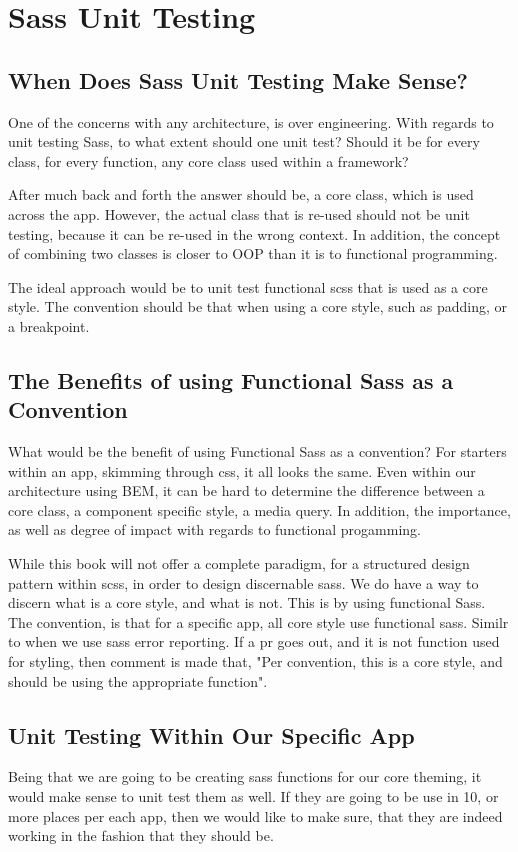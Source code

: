 \maketitle{}
\section{ Sass Unit Testing }

\subsection{ When Does Sass Unit Testing Make Sense? }
One of the concerns with any architecture, is over engineering. With regards to
unit testing Sass, to what extent should one unit test? Should it be for every
class, for every function, any core class used within a framework?

After much back and forth the answer should be, a core class, which is used
across the app. However, the actual class that is re-used should not be unit
testing, because it can be re-used in the wrong context. In addition, the
concept of combining two classes is closer to OOP than it is to functional
programming.

The ideal approach would be to unit test functional scss that is used as a
core style. The convention should be that when using a core style, such as
padding, or a breakpoint.

\subsection{ The Benefits of using Functional Sass as a Convention }
What would be the benefit of using Functional Sass as a convention? For starters
within an app, skimming through css, it all looks the same. Even within our
architecture using BEM, it can be hard to determine the difference between a
core class, a component specific style, a media query. In addition, the
importance, as well as degree of impact with regards to functional progamming.

While this book will not offer a complete paradigm, for a structured design
pattern within scss, in order to design discernable sass. We do have a way to
discern what is a core style, and what is not. This is by using functional Sass.
The convention, is that for a specific app, all core style use functional sass.
Similr to when we use sass error reporting. If a pr goes out, and it is not
function used for styling, then comment is made that, "Per convention, this is
a core style, and should be using the appropriate function".

\subsection{ Unit Testing Within Our Specific App }
Being that we are going to be creating sass functions for our core theming, it
would make sense to unit test them as well. If they are going to be use in 10,
or more places per each app, then we would like to make sure, that they are
indeed working in the fashion that they should be.
